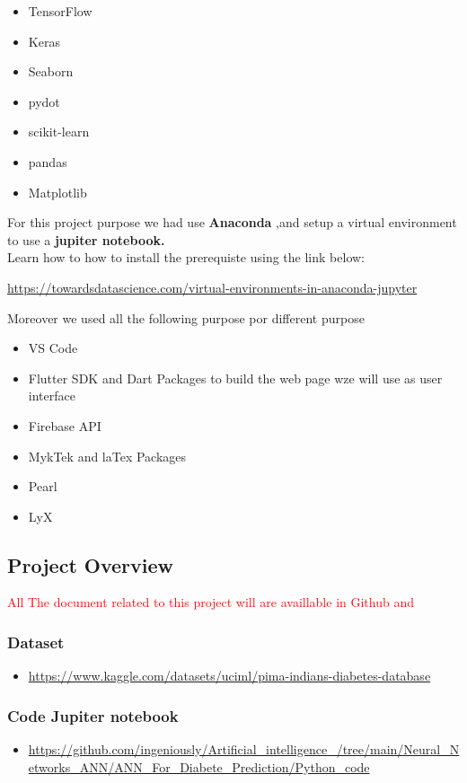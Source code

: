 \documentclass[rnd]{mas_proposal}
\begin{document}
\begin{itemize}
    \item TensorFlow
    \item Keras
    \item Seaborn
    \item pydot
    \item scikit-learn
    \item pandas
    \item Matplotlib
\end{itemize}

For this project purpose we had use 
\textbf{Anaconda },and setup a virtual environment to use a \textbf{jupiter notebook.}
\\
Learn how to how to install the prerequiste using the link below:

\url{https://towardsdatascience.com/virtual-environments-in-anaconda-jupyter}

Moreover we used all the following purpose por different purpose


\begin{itemize}
    \item VS Code
    \item Flutter SDK and Dart Packages to build the web page wze will use as user interface 
    \item  Firebase API
    \item MykTek and laTex Packages
    \item Pearl
    \item LyX
\end{itemize}

\subsection{Project Overview }
\textcolor{red}{All The document related to this project will are availlable in Github and 
}
\subsubsection*{Dataset}
\begin{itemize}
    \item \url{https://www.kaggle.com/datasets/uciml/pima-indians-diabetes-database}
\end{itemize}

\subsubsection*{Code Jupiter notebook}
\begin{itemize}
    \item \url{https://github.com/ingeniously/Artificial_intelligence_/tree/main/Neural_Networks_ANN/ANN_For_Diabete_Prediction/Python_code}
\end{itemize}
\end{document}
